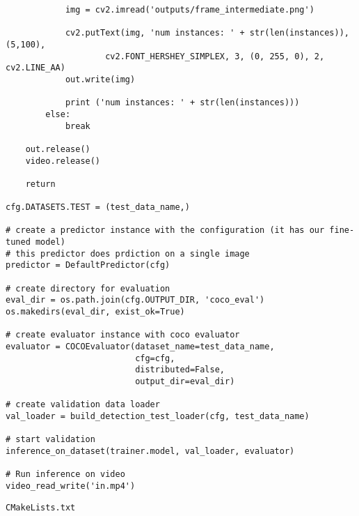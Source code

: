 \begin{verbatim}
            img = cv2.imread('outputs/frame_intermediate.png')

            cv2.putText(img, 'num instances: ' + str(len(instances)), (5,100),
            		cv2.FONT_HERSHEY_SIMPLEX, 3, (0, 255, 0), 2, cv2.LINE_AA)
            out.write(img)

            print ('num instances: ' + str(len(instances)))
        else:
            break
    
    out.release()
    video.release()
    
    return

cfg.DATASETS.TEST = (test_data_name,)

# create a predictor instance with the configuration (it has our fine-tuned model)
# this predictor does prdiction on a single image
predictor = DefaultPredictor(cfg)

# create directory for evaluation
eval_dir = os.path.join(cfg.OUTPUT_DIR, 'coco_eval')
os.makedirs(eval_dir, exist_ok=True)

# create evaluator instance with coco evaluator
evaluator = COCOEvaluator(dataset_name=test_data_name,
                          cfg=cfg,
                          distributed=False,
                          output_dir=eval_dir)

# create validation data loader
val_loader = build_detection_test_loader(cfg, test_data_name)

# start validation 
inference_on_dataset(trainer.model, val_loader, evaluator)

# Run inference on video
video_read_write('in.mp4')
\end{verbatim}

\clearpage
\begin{verbatim}
CMakeLists.txt
\end{verbatim}

